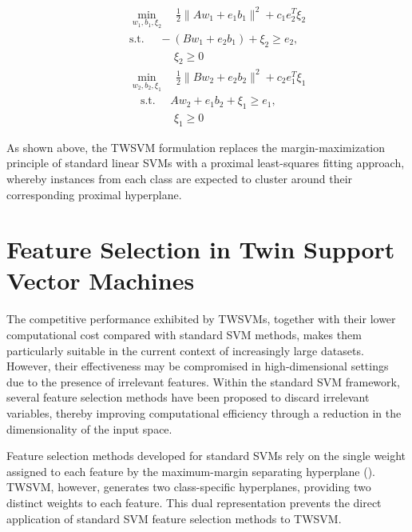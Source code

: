 \documentclass[12pt]{report} %
\begin{document}
\begin{subequations}
\label{eq:soft_margin_twsvm}
\begin{align}
&\min_{w_1, b_1, \xi_2} \quad \frac{1}{2}\|A w_1 + e_1 b_1\|^2 + c_1 e_2^T \xi_2 \\
\quad & \text{s.t. } \quad -(B w_1 + e_2 b_1) + \xi_2 \geq e_2, \nonumber\\
& \quad \quad \quad \quad \xi_2 \geq 0 \nonumber
\nonumber \\[2ex]
& \min_{w_2, b_2, \xi_1} \quad \frac{1}{2}\|B w_2 + e_2 b_2\|^2 + c_2 e_1^T \xi_1 \\
& \quad \text{s.t. }  \quad A w_2 + e_1 b_2 + \xi_1 \geq e_1, \nonumber \\
&\quad \quad \quad \quad \xi_1 \geq 0 \nonumber
\end{align}
\end{subequations}

As shown above, the TWSVM formulation replaces the margin-maximization principle of standard linear SVMs with a proximal least-squares fitting approach, whereby instances from each class are expected to cluster around their corresponding proximal hyperplane.

\newpage

\section{Feature Selection in Twin Support Vector Machines} \label{sec:fs-twsvm}

The competitive performance exhibited by TWSVMs, together with their lower computational cost compared with standard SVM methods, makes them particularly suitable in the current context of increasingly large datasets. However, their effectiveness may be compromised in high-dimensional settings due to the presence of irrelevant features. Within the standard SVM framework, several feature selection methods have been proposed to discard irrelevant variables, thereby improving computational efficiency through a reduction in the dimensionality of the input space.

Feature selection methods developed for standard SVMs rely on the single weight assigned to each feature by the maximum-margin separating hyperplane (\cite{chang2008feature}). TWSVM, however, generates two class-specific hyperplanes, providing two distinct weights to each feature. This dual representation prevents the direct application of standard SVM feature selection methods to TWSVM.
\end{document}
